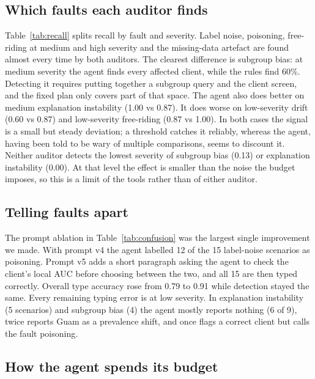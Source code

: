 \documentclass[conference]{IEEEtran}
\newcommand{\figdir}{../results/fedauditor/figures}
\begin{document}


\subsection{Which faults each auditor finds}

Table~\ref{tab:recall} splits recall by fault and severity. Label noise, poisoning, free-riding at
medium and high severity and the missing-data artefact are found almost every time by both
auditors. The clearest difference is subgroup bias: at medium severity the agent finds every
affected client, while the rules find 60\%. Detecting it requires putting together a subgroup query
and the client screen, and the fixed plan only covers part of that space. The agent also does better
on medium explanation instability (1.00 vs 0.87). It does worse on low-severity drift (0.60 vs 0.87)
and low-severity free-riding (0.87 vs 1.00). In both cases the signal is a small but steady
deviation; a threshold catches it reliably, whereas the agent, having been told to be wary of
multiple comparisons, seems to discount it. Neither auditor detects the lowest severity of subgroup
bias (0.13) or explanation instability (0.00). At that level the effect is smaller than the noise
the budget imposes, so this is a limit of the tools rather than of either auditor.

\subsection{Telling faults apart}

The prompt ablation in Table~\ref{tab:confusion} was the largest single improvement we made. With
prompt v4 the agent labelled 12 of the 15 label-noise scenarios as poisoning. Prompt v5 adds a short
paragraph asking the agent to check the client's local AUC before choosing between the two, and all
15 are then typed correctly. Overall type accuracy rose from 0.79 to 0.91 while detection stayed the
same. Every remaining typing error is at low severity. In explanation instability (5 scenarios) and
subgroup bias (4) the agent mostly reports nothing (6 of 9), twice reports Guam as a prevalence
shift, and once flags a correct client but calls the fault poisoning.



\subsection{How the agent spends its budget}
\end{document}
